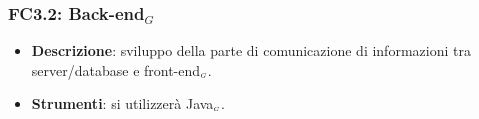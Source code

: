 \subsubsection{FC3.2: Back-end$_G$}\label{fasiProgettoVisualizzazioneDatiBackEnd}

\begin{itemize}
	\item \textbf{Descrizione}: sviluppo della parte di comunicazione di informazioni tra server/database e front-end$_{\scaleto{G}{3pt}}$.
	\item \textbf{Strumenti}: si utilizzerà Java$_{\scaleto{G}{3pt}}$.
\end{itemize}


